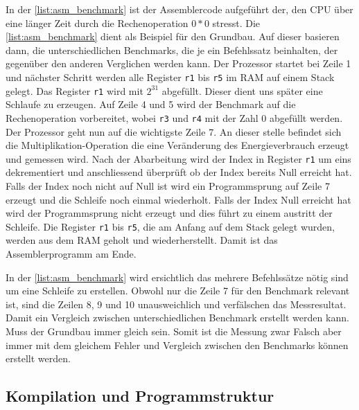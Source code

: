 In der \autoref{list:asm_benchmark} ist der Assemblercode aufgeführt der, den CPU über eine länger Zeit durch die Rechenoperation $0*0$ stresst. Die \autoref{list:asm_benchmark} dient als Beispiel für den Grundbau. Auf dieser basieren dann, die unterschiedlichen Benchmarks, die je ein Befehlssatz beinhalten, der gegenüber den anderen Verglichen werden kann. Der Prozessor startet bei Zeile 1 und nächster Schritt werden alle Register \texttt{r1} bis \texttt{r5} im RAM auf einem Stack gelegt. Das Register \texttt{r1} wird mit $2^{31}$ abgefüllt. Dieser dient uns später eine Schlaufe zu erzeugen. Auf Zeile 4 und 5 wird der Benchmark auf die Rechenoperation vorbereitet, wobei \texttt{r3} und \texttt{r4} mit der Zahl 0 abgefüllt werden. Der Prozessor geht nun auf die wichtigste Zeile 7. An dieser stelle befindet sich die Multiplikation-Operation die eine Veränderung des Energieverbrauch erzeugt und gemessen wird. Nach der Abarbeitung wird der Index in Register \texttt{r1} um eins dekrementiert und anschliessend überprüft ob der Index bereits Null erreicht hat. Falls der Index noch nicht auf Null ist wird ein Programmsprung auf Zeile 7 erzeugt und die Schleife noch einmal wiederholt. Falls der Index Null erreicht hat wird der Programmsprung nicht erzeugt und dies führt zu einem austritt der Schleife. Die Register  \texttt{r1} bis \texttt{r5}, die am Anfang auf dem Stack gelegt wurden, werden aus dem RAM geholt und wiederherstellt. Damit ist das Assemblerprogramm am Ende.
\par
In der \autoref{list:asm_benchmark} wird ersichtlich das mehrere Befehlssätze nötig sind um eine Schleife zu erstellen. Obwohl nur die Zeile 7 für den Benchmark relevant ist, sind die Zeilen 8, 9 und 10 unausweichlich und verfälschen das Messresultat. Damit ein Vergleich zwischen unterschiedlichen Benchmark erstellt werden kann. Muss der Grundbau immer gleich sein. Somit ist die Messung zwar Falsch aber immer mit dem gleichem Fehler und Vergleich zwischen den Benchmarks können erstellt werden.


\subsection{Kompilation und Programmstruktur}

